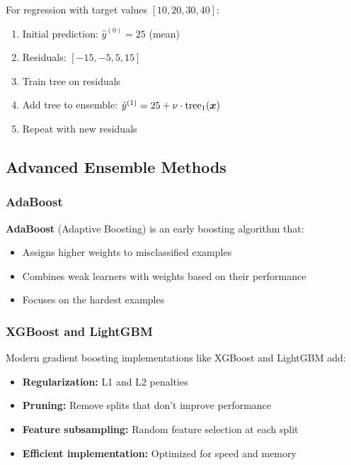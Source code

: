 \begin{example}
For regression with target values $[10, 20, 30, 40]$:
\begin{enumerate}
    \item Initial prediction: $\hat{y}^{(0)} = 25$ (mean)
    \item Residuals: $[-15, -5, 5, 15]$
    \item Train tree on residuals
    \item Add tree to ensemble: $\hat{y}^{(1)} = 25 + \nu \cdot \text{tree}_1(\boldsymbol{x})$
    \item Repeat with new residuals
\end{enumerate}
\end{example}

\subsection{Advanced Ensemble Methods}

\subsubsection{AdaBoost}

\textbf{AdaBoost} (Adaptive Boosting) is an early boosting algorithm that:
\begin{itemize}
    \item Assigns higher weights to misclassified examples
    \item Combines weak learners with weights based on their performance
    \item Focuses on the hardest examples
\end{itemize}

\subsubsection{XGBoost and LightGBM}

Modern gradient boosting implementations like XGBoost and LightGBM add:
\begin{itemize}
    \item \textbf{Regularization:} L1 and L2 penalties
    \item \textbf{Pruning:} Remove splits that don't improve performance
    \item \textbf{Feature subsampling:} Random feature selection at each split
    \item \textbf{Efficient implementation:} Optimized for speed and memory
\end{itemize}

